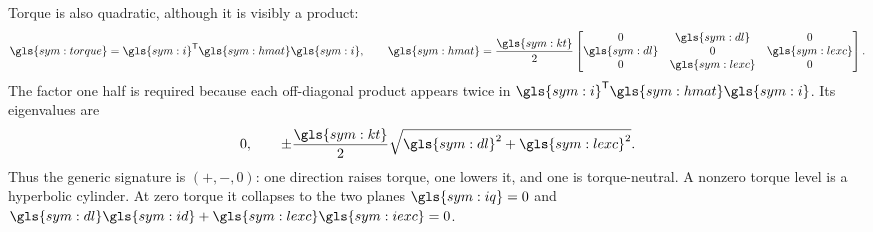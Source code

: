 Torque is also quadratic, although it is visibly a product:
\begin{equation}
 \gls{sym:torque}=\gls{sym:i}^{\mathsf T}\gls{sym:hmat}\gls{sym:i},\qquad
 \gls{sym:hmat}=\frac{\gls{sym:kt}}2
 \begin{bmatrix}
 0&\gls{sym:dl}&0\\
 \gls{sym:dl}&0&\gls{sym:lexc}\\
 0&\gls{sym:lexc}&0
 \end{bmatrix}.
 \label{eq:H-matrix}
\end{equation}
The factor one half is required because each off-diagonal product appears
twice in \(\gls{sym:i}^{\mathsf T}\gls{sym:hmat}\gls{sym:i}\). Its eigenvalues
are
\begin{equation}
 0,\qquad \pm\frac{\gls{sym:kt}}2
 \sqrt{\gls{sym:dl}^{2}+\gls{sym:lexc}^{2}}.
 \label{eq:H-eigenvalues}
\end{equation}
Thus the generic signature is \((+,-,0)\): one direction raises torque, one
lowers it, and one is torque-neutral. A nonzero torque level is a hyperbolic
cylinder. At zero torque it collapses to the two planes
\(\gls{sym:iq}=0\) and
\(\gls{sym:dl}\gls{sym:id}+\gls{sym:lexc}\gls{sym:iexc}=0\).

